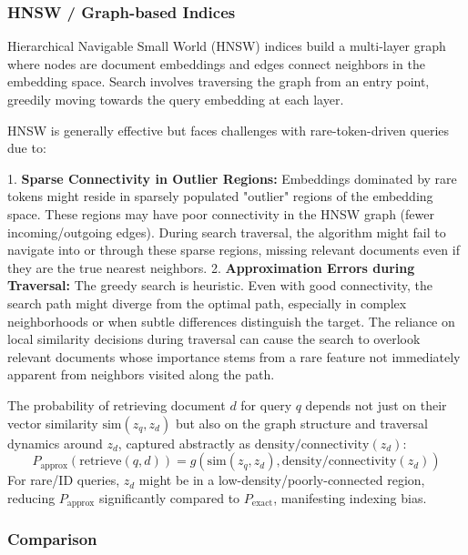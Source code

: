 \documentclass[manuscript]{acmart}
\begin{document}
\subsubsection{HNSW / Graph-based Indices} %

Hierarchical Navigable Small World (HNSW) indices \cite{malkov2019efficient} build a multi-layer graph where nodes are document embeddings and edges connect neighbors in the embedding space. Search involves traversing the graph from an entry point, greedily moving towards the query embedding at each layer.

HNSW is generally effective but faces challenges with rare-token-driven queries due to:

1.  \textbf{Sparse Connectivity in Outlier Regions:} Embeddings dominated by rare tokens might reside in sparsely populated "outlier" regions of the embedding space. These regions may have poor connectivity in the HNSW graph (fewer incoming/outgoing edges). During search traversal, the algorithm might fail to navigate into or through these sparse regions, missing relevant documents even if they are the true nearest neighbors.
2.  \textbf{Approximation Errors during Traversal:} The greedy search is heuristic. Even with good connectivity, the search path might diverge from the optimal path, especially in complex neighborhoods or when subtle differences distinguish the target. The reliance on local similarity decisions during traversal can cause the search to overlook relevant documents whose importance stems from a rare feature not immediately apparent from neighbors visited along the path.

The probability of retrieving document $d$ for query $q$ depends not just on their vector similarity $\text{sim}(z_q, z_d)$ but also on the graph structure and traversal dynamics around $z_d$, captured abstractly as $\text{density/connectivity}(z_d)$:
\begin{equation}
P_{\text{approx}}(\text{retrieve}(q, d)) = g(\text{sim}(z_q, z_d), \text{density/connectivity}(z_d)) \label{eq:hnsw_retrieval_prob}
\end{equation}
For rare/ID queries, $z_d$ might be in a low-density/poorly-connected region, reducing $P_{\text{approx}}$ significantly compared to $P_{\text{exact}}$, manifesting indexing bias.

\subsubsection{Comparison}
\end{document}
